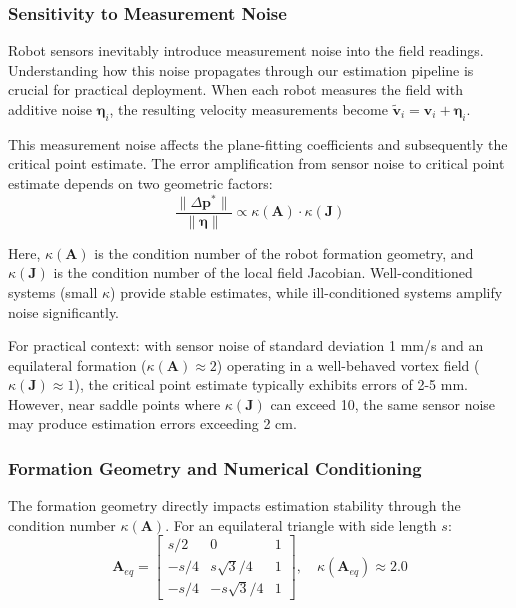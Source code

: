 \documentclass[lettersize,journal]{IEEEtran}
\begin{document}
\subsubsection{Sensitivity to Measurement Noise}

Robot sensors inevitably introduce measurement noise into the field readings. Understanding how this noise propagates through our estimation pipeline is crucial for practical deployment. When each robot measures the field with additive noise $\boldsymbol{\eta}_i$, the resulting velocity measurements become $\tilde{\mathbf{v}}_i = \mathbf{v}_i + \boldsymbol{\eta}_i$.

This measurement noise affects the plane-fitting coefficients and subsequently the critical point estimate. The error amplification from sensor noise to critical point estimate depends on two geometric factors:
\begin{equation}
\frac{\|\Delta\mathbf{p}^*\|}{\|\boldsymbol{\eta}\|} \propto \kappa(\mathbf{A}) \cdot \kappa(\mathbf{J})
\end{equation}

Here, $\kappa(\mathbf{A})$ is the condition number of the robot formation geometry, and $\kappa(\mathbf{J})$ is the condition number of the local field Jacobian. Well-conditioned systems (small $\kappa$) provide stable estimates, while ill-conditioned systems amplify noise significantly.

For practical context: with sensor noise of standard deviation 1 mm/s and an equilateral formation ($\kappa(\mathbf{A}) \approx 2$) operating in a well-behaved vortex field ($\kappa(\mathbf{J}) \approx 1$), the critical point estimate typically exhibits errors of 2-5 mm. However, near saddle points where $\kappa(\mathbf{J})$ can exceed 10, the same sensor noise may produce estimation errors exceeding 2 cm.

\subsubsection{Formation Geometry and Numerical Conditioning}

The formation geometry directly impacts estimation stability through the condition number $\kappa(\mathbf{A})$. For an equilateral triangle with side length $s$:
\begin{equation}
\mathbf{A}_{eq} = \begin{bmatrix}
s/2 & 0 & 1 \\
-s/4 & s\sqrt{3}/4 & 1 \\
-s/4 & -s\sqrt{3}/4 & 1
\end{bmatrix}, \quad \kappa(\mathbf{A}_{eq}) \approx 2.0
\end{equation}
\end{document}
